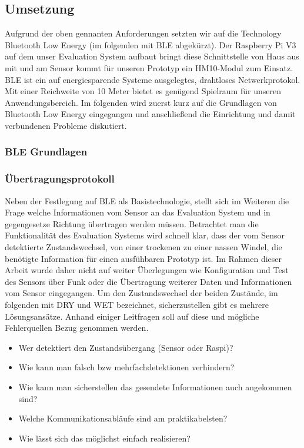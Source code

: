 \subsection{Umsetzung}
Aufgrund der oben gennanten Anforderungen setzten wir auf die Technology Bluetooth Low Energy (im folgenden mit BLE abgekürzt). Der Raspberry Pi V3 auf dem unser Evaluation System aufbaut bringt diese Schnittstelle von Haus aus mit und am Sensor kommt für unseren Prototyp ein HM10-Modul zum Einsatz. BLE ist ein auf energiesparende Systeme ausgelegtes, drahtloses Netwerkprotokol. Mit einer Reichweite von 10 Meter \cite{ble_spec} bietet es genügend Spielraum für unseren Anwendungsbereich. Im folgenden wird zuerst kurz auf die Grundlagen von Bluetooth Low Energy eingegangen und anschließend die Einrichtung und damit verbundenen Probleme diskutiert. 

\subsubsection{BLE Grundlagen}

\subsubsection{Übertragungsprotokoll}
\label{subsubsec:unser_protokoll}

Neben der Festlegung auf BLE als Basistechnologie, stellt sich im Weiteren die Frage welche Informationen vom Sensor an das Evaluation System und in gegengesetze Richtung übertragen werden müssen. Betrachtet man die Funktionalität des Evaluation Systems wird schnell klar, dass der vom Sensor detektierte Zustandswechsel, von einer trockenen zu einer nassen Windel, die benötigte Information für einen ausfühbaren Prototyp ist. Im Rahmen dieser Arbeit wurde daher nicht auf weiter Überlegungen wie Konfiguration und Test des Sensors über Funk oder die Übertragung weiterer Daten und Informationen vom Sensor eingegangen. Um den Zustandswechsel der beiden Zustände, im folgenden mit DRY und WET bezeichnet, sicherzustellen gibt es mehrere Lösungsansätze. Anhand einiger Leitfragen soll auf diese und mögliche Fehlerquellen Bezug genommen werden.

\begin{itemize}
  \item Wer detektiert den Zustandsübergang (Sensor oder Raspi)?
  \item Wie kann man falsch bzw mehrfachdetektionen verhindern?
  \item Wie kann man sicherstellen das gesendete Informationen auch angekommen sind?
  \item Welche Kommunikationsabläufe sind am praktikabelsten?
  \item Wie lässt sich das möglichst einfach realisieren?
\end{itemize}

